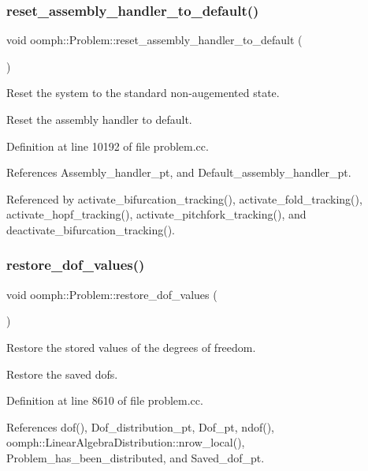 \subsubsection{\texorpdfstring{reset\+\_\+assembly\+\_\+handler\+\_\+to\+\_\+default()}{reset\_assembly\_handler\_to\_default()}}
{\footnotesize\ttfamily void oomph\+::\+Problem\+::reset\+\_\+assembly\+\_\+handler\+\_\+to\+\_\+default (\begin{DoxyParamCaption}{ }\end{DoxyParamCaption})}



Reset the system to the standard non-\/augemented state. 

Reset the assembly handler to default. 

Definition at line 10192 of file problem.\+cc.



References Assembly\+\_\+handler\+\_\+pt, and Default\+\_\+assembly\+\_\+handler\+\_\+pt.



Referenced by activate\+\_\+bifurcation\+\_\+tracking(), activate\+\_\+fold\+\_\+tracking(), activate\+\_\+hopf\+\_\+tracking(), activate\+\_\+pitchfork\+\_\+tracking(), and deactivate\+\_\+bifurcation\+\_\+tracking().

\mbox{\label{classoomph_1_1Problem_ad19fe0723fe6356776cfbe28e46ea64b}} 
\subsubsection{\texorpdfstring{restore\+\_\+dof\+\_\+values()}{restore\_dof\_values()}}
{\footnotesize\ttfamily void oomph\+::\+Problem\+::restore\+\_\+dof\+\_\+values (\begin{DoxyParamCaption}{ }\end{DoxyParamCaption})}



Restore the stored values of the degrees of freedom. 

Restore the saved dofs. 

Definition at line 8610 of file problem.\+cc.



References dof(), Dof\+\_\+distribution\+\_\+pt, Dof\+\_\+pt, ndof(), oomph\+::\+Linear\+Algebra\+Distribution\+::nrow\+\_\+local(), Problem\+\_\+has\+\_\+been\+\_\+distributed, and Saved\+\_\+dof\+\_\+pt.



